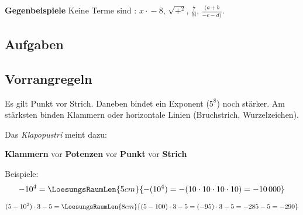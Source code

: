 \textbf{Gegenbeispiele}
Keine Terme sind \zB{}: $x \cdot{}-8$, $\sqrt{+^2}$, $\frac{7}{\mathbb{N}}$, $\frac{(a+b}{-c-d)}$.

\newpage

\subsection*{Aufgaben}


\newpage

\subsection{Vorrangregeln}

Es gilt Punkt vor Strich. Daneben bindet ein Exponent (\zB $5^8$) noch
stärker. Am stärksten binden Klammern oder horizontale Linien
(Bruchstrich, Wurzelzeichen).

\begin{center}
  Das \textit{Klapopustri} meint dazu:

  \textbf{Klammern} vor \textbf{Potenzen} vor \textbf{Punkt} vor
  \textbf{Strich}
  
\end{center}


Beispiele:
$$-10^4 = \LoesungsRaumLen{5cm}{-(10^4) = -  (10\cdot{}10\cdot{}10\cdot{}10) = -10\,000}$$

$$(5-10^2)\cdot{} 3 - 5 = \LoesungsRaumLen{8cm}{(5-100)\cdot{}3-5 =
  (-95)\cdot{}3 -5 = -285 - 5 = - 290} $$





